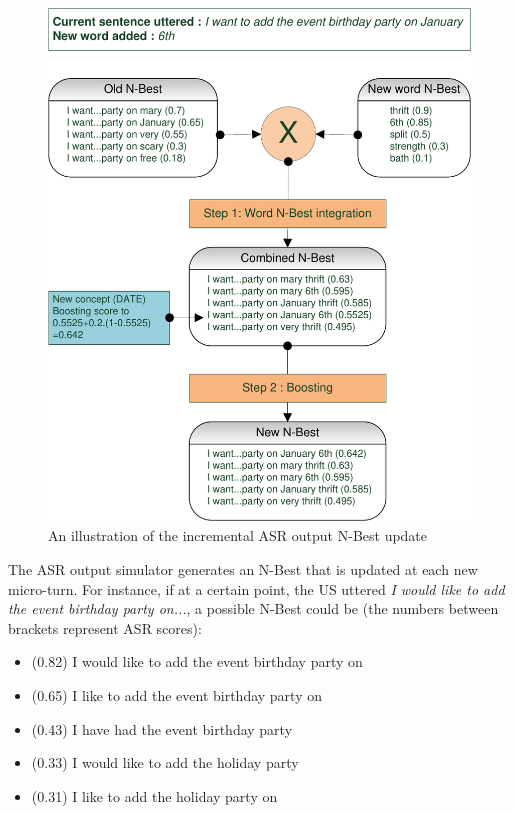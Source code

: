 			\begin{figure}[hb]
          \centering
          \includegraphics[scale=0.8]{figures/ASRSimu.pdf}
          \caption{An illustration of the incremental ASR output N-Best update}
          \label{fig:asrsimu}
        \end{figure}
    
     	The ASR output simulator generates an N-Best that is updated at each new micro-turn. For instance, if at a certain point, the US uttered \textit{I would like to add the event birthday party on...}, a possible N-Best could be (the numbers between brackets represent ASR scores):
        
        \begin{itemize}
					\item (0.82) I would like to add the event birthday party on
					\item (0.65) I like to add the event birthday party on
					\item (0.43) I have had the event birthday party
					\item (0.33) I would like to add the holiday party
					\item (0.31) I like to add the holiday party on
        \end{itemize}
        
